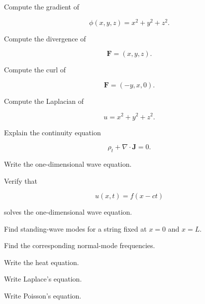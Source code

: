 \begin{exercise}[2]
Compute the gradient of

\[
\phi(x,y,z)
=
x^2+y^2+z^2.
\]
\end{exercise}

\begin{exercise}[2]
Compute the divergence of

\[
\mathbf{F}
=
(x,y,z).
\]
\end{exercise}

\begin{exercise}[2]
Compute the curl of

\[
\mathbf{F}
=
(-y,x,0).
\]
\end{exercise}

\begin{exercise}[2]
Compute the Laplacian of

\[
u=x^2+y^2+z^2.
\]
\end{exercise}

\begin{exercise}[3]
Explain the continuity equation

\[
\rho_t+\nabla\cdot\mathbf{J}=0.
\]
\end{exercise}

\begin{exercise}[2]
Write the one-dimensional wave equation.
\end{exercise}

\begin{exercise}[3]
Verify that

\[
u(x,t)=f(x-ct)
\]

solves the one-dimensional wave equation.
\end{exercise}

\begin{exercise}[3]
Find standing-wave modes for a string fixed at \(x=0\) and \(x=L\).
\end{exercise}

\begin{exercise}[3]
Find the corresponding normal-mode frequencies.
\end{exercise}

\begin{exercise}[2]
Write the heat equation.
\end{exercise}

\begin{exercise}[2]
Write Laplace's equation.
\end{exercise}

\begin{exercise}[2]
Write Poisson's equation.
\end{exercise}

